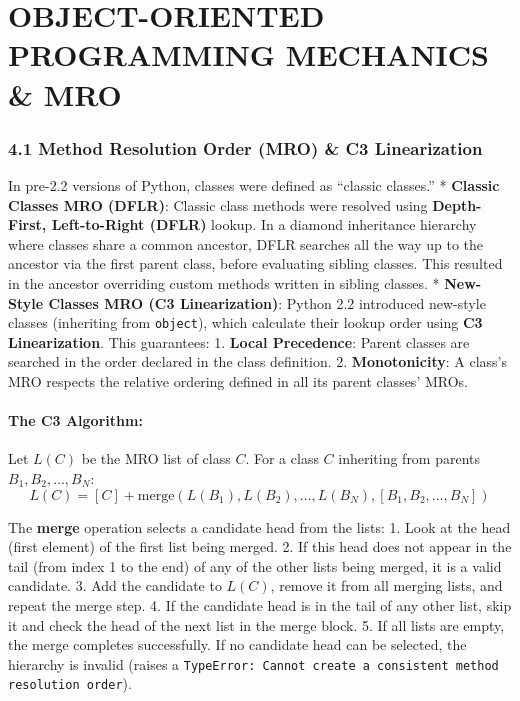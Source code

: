 \hypertarget{object-oriented-programming-mechanics-mro}{%
\chapter{OBJECT-ORIENTED PROGRAMMING MECHANICS \&
MRO}\label{object-oriented-programming-mechanics-mro}}

\hypertarget{method-resolution-order-mro-c3-linearization}{%
\subsection{4.1 Method Resolution Order (MRO) \& C3
Linearization}\label{method-resolution-order-mro-c3-linearization}}

In pre-2.2 versions of Python, classes were defined as ``classic
classes.'' * \textbf{Classic Classes MRO (DFLR)}: Classic class methods
were resolved using \textbf{Depth-First, Left-to-Right (DFLR)} lookup.
In a diamond inheritance hierarchy where classes share a common
ancestor, DFLR searches all the way up to the ancestor via the first
parent class, before evaluating sibling classes. This resulted in the
ancestor overriding custom methods written in sibling classes. *
\textbf{New-Style Classes MRO (C3 Linearization)}: Python 2.2 introduced
new-style classes (inheriting from \passthrough{\lstinline!object!}),
which calculate their lookup order using \textbf{C3 Linearization}. This
guarantees: 1. \textbf{Local Precedence}: Parent classes are searched in
the order declared in the class definition. 2. \textbf{Monotonicity}: A
class's MRO respects the relative ordering defined in all its parent
classes' MROs.

\hypertarget{the-c3-algorithm}{%
\subsubsection{The C3 Algorithm:}\label{the-c3-algorithm}}

Let \(L(C)\) be the MRO list of class \(C\). For a class \(C\)
inheriting from parents \(B_1, B_2, \dots, B_N\):
\[L(C) = [C] + \text{merge}(L(B_1), L(B_2), \dots, L(B_N), [B_1, B_2, \dots, B_N])\]

The \textbf{merge} operation selects a candidate head from the lists: 1.
Look at the head (first element) of the first list being merged. 2. If
this head does not appear in the tail (from index 1 to the end) of any
of the other lists being merged, it is a valid candidate. 3. Add the
candidate to \(L(C)\), remove it from all merging lists, and repeat the
merge step. 4. If the candidate head is in the tail of any other list,
skip it and check the head of the next list in the merge block. 5. If
all lists are empty, the merge completes successfully. If no candidate
head can be selected, the hierarchy is invalid (raises a
\passthrough{\lstinline!TypeError: Cannot create a consistent method resolution order!}).

